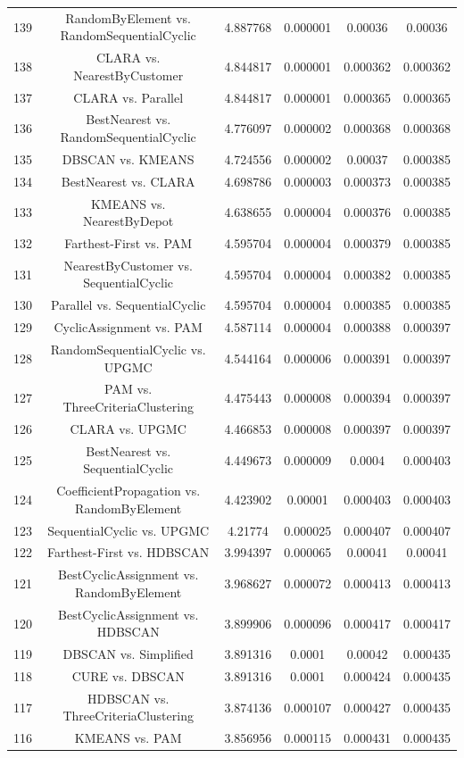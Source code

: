 \documentclass[a4paper,10pt]{article}
\begin{document}
\begin{landscape}
\begin{table}[!htp]
\begin{tabular}{cccccc}
139&RandomByElement vs. RandomSequentialCyclic&4.887768&0.000001&0.00036&0.00036\\
138&CLARA vs. NearestByCustomer&4.844817&0.000001&0.000362&0.000362\\
137&CLARA vs. Parallel&4.844817&0.000001&0.000365&0.000365\\
136&BestNearest vs. RandomSequentialCyclic&4.776097&0.000002&0.000368&0.000368\\
135&DBSCAN vs. KMEANS&4.724556&0.000002&0.00037&0.000385\\
134&BestNearest vs. CLARA&4.698786&0.000003&0.000373&0.000385\\
133&KMEANS vs. NearestByDepot&4.638655&0.000004&0.000376&0.000385\\
132&Farthest-First vs. PAM&4.595704&0.000004&0.000379&0.000385\\
131&NearestByCustomer vs. SequentialCyclic&4.595704&0.000004&0.000382&0.000385\\
130&Parallel vs. SequentialCyclic&4.595704&0.000004&0.000385&0.000385\\
129&CyclicAssignment vs. PAM&4.587114&0.000004&0.000388&0.000397\\
128&RandomSequentialCyclic vs. UPGMC&4.544164&0.000006&0.000391&0.000397\\
127&PAM vs. ThreeCriteriaClustering&4.475443&0.000008&0.000394&0.000397\\
126&CLARA vs. UPGMC&4.466853&0.000008&0.000397&0.000397\\
125&BestNearest vs. SequentialCyclic&4.449673&0.000009&0.0004&0.000403\\
124&CoefficientPropagation vs. RandomByElement&4.423902&0.00001&0.000403&0.000403\\
123&SequentialCyclic vs. UPGMC&4.21774&0.000025&0.000407&0.000407\\
122&Farthest-First vs. HDBSCAN&3.994397&0.000065&0.00041&0.00041\\
121&BestCyclicAssignment vs. RandomByElement&3.968627&0.000072&0.000413&0.000413\\
120&BestCyclicAssignment vs. HDBSCAN&3.899906&0.000096&0.000417&0.000417\\
119&DBSCAN vs. Simplified&3.891316&0.0001&0.00042&0.000435\\
118&CURE vs. DBSCAN&3.891316&0.0001&0.000424&0.000435\\
117&HDBSCAN vs. ThreeCriteriaClustering&3.874136&0.000107&0.000427&0.000435\\
116&KMEANS vs. PAM&3.856956&0.000115&0.000431&0.000435\\

\end{tabular}
\end{table}
\end{landscape}
\end{document}
